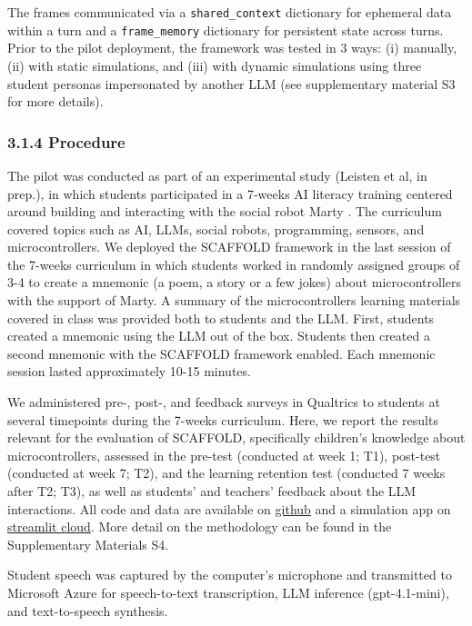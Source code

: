 \documentclass[fleqn,10pt]{wlscirep}
\begin{document}
The frames communicated via a \texttt{shared\_context} dictionary for ephemeral data within a turn and a \texttt{frame\_memory} dictionary for persistent state across turns. Prior to the pilot deployment, the framework was tested in 3 ways: (i) manually, (ii) with static simulations, and (iii) with dynamic simulations using three student personas impersonated by another LLM (see supplementary material S3 for more details).

\subsubsection*{3.1.4 Procedure}

The pilot was conducted as part of an experimental study (Leisten et al, in prep.), in which students participated in a 7-weeks AI literacy training centered around building and interacting with the social robot Marty \cite{Robotical2024}. The curriculum covered topics such as AI, LLMs, social robots, programming, sensors, and microcontrollers. We deployed the SCAFFOLD framework in the last session of the 7-weeks curriculum in which students worked in randomly assigned groups of 3-4 to create a mnemonic (a poem, a story or a few jokes) about microcontrollers with the support of Marty. A summary of the microcontrollers learning materials covered in class was provided both to students and the LLM. First, students created a mnemonic using the LLM out of the box. Students then created a second mnemonic with the SCAFFOLD framework enabled. Each mnemonic session lasted approximately 10-15 minutes.

We administered pre-, post-, and feedback surveys in Qualtrics \cite{Qualtrics2024} to students at several timepoints during the 7-weeks curriculum. Here, we report the results relevant for the evaluation of SCAFFOLD, specifically children's knowledge about microcontrollers, assessed in the pre-test (conducted at week 1; T1), post-test (conducted at week 7; T2), and the learning retention test (conducted 7 weeks after T2; T3), as well as students' and teachers' feedback about the LLM interactions. All code and data are available on \href{https://github.com/OlgaMuss/LLM_Frames_Paper}{github} and a simulation app on \href{https://buildbot-4tzkvoxzssupnzkb9e6va4.streamlit.app}{streamlit cloud}. More detail on the methodology can be found in the Supplementary Materials S4.

Student speech was captured by the computer's microphone and transmitted to Microsoft Azure for speech-to-text transcription, LLM inference (gpt-4.1-mini), and text-to-speech synthesis.
\end{document}
